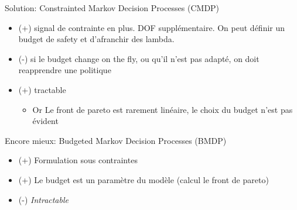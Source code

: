 \documentclass[french]{beamer}
\begin{document}
    \begin{frame}

        \begin{block}{Solution: Constrainted Markov Decision Processes (CMDP)}
            \begin{itemize}
                \item (+) signal de contrainte en plus. DOF supplémentaire. On peut définir un budget de safety et d'afranchir des lambda.
                \item (-) si le budget change on the fly, ou qu'il n'est pas adapté, on doit reapprendre une politique
                \item (+) tractable
                \begin{itemize}
                    \item  Or Le front de pareto est rarement linéaire, le choix du budget n'est pas évident
                \end{itemize}
            \end{itemize}
        \end{block}
    \end{frame}

    \begin{frame}
        \begin{block}{Encore mieux: Budgeted Markov Decision Processes (BMDP)}
            \begin{itemize}
                \item (+) Formulation sous contraintes
                \item (+) Le budget est un paramètre du modèle (calcul le front de pareto)
                \item (-) \textit{Intractable}
            \end{itemize}
        \end{block}


    \end{frame}




    \begin{frame}
        \printbibliography[heading=bibempty]

    \end{frame}
\end{document}
